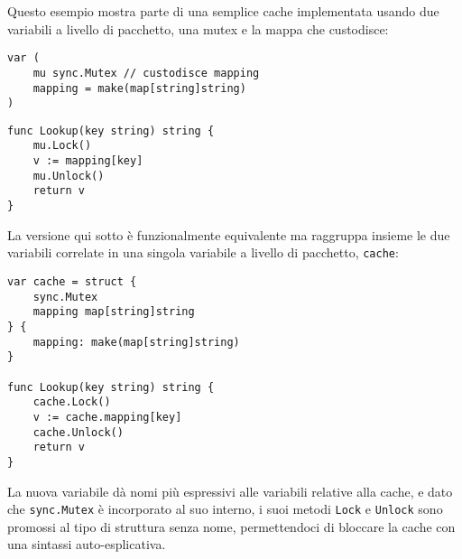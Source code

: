 Questo esempio mostra parte di una semplice cache implementata usando due variabili a livello di pacchetto, una mutex e la mappa che custodisce:
\begin{lstlisting}[frame=single, label={lst:lstlisting5-3.8}]
var (
    mu sync.Mutex // custodisce mapping
    mapping = make(map[string]string)
)
\end{lstlisting}
\begin{lstlisting}[frame=single, label={lst:lstlisting5-3.9}]
func Lookup(key string) string {
    mu.Lock()
    v := mapping[key]
    mu.Unlock()
    return v
}
\end{lstlisting}
La versione qui sotto è funzionalmente equivalente ma raggruppa insieme le due variabili correlate in una singola variabile a livello di pacchetto, \verb|cache|:
\begin{lstlisting}[frame=single, label={lst:lstlisting5-3.10}]
var cache = struct {
    sync.Mutex
    mapping map[string]string
} {
    mapping: make(map[string]string)
}

func Lookup(key string) string {
    cache.Lock()
    v := cache.mapping[key]
    cache.Unlock()
    return v
}
\end{lstlisting}
La nuova variabile dà nomi più espressivi alle variabili relative alla cache, e dato che \verb|sync.Mutex| è incorporato al suo interno, i suoi metodi \verb|Lock| e \verb|Unlock| sono promossi al tipo di struttura senza nome, permettendoci di bloccare la cache con una sintassi auto-esplicativa.


